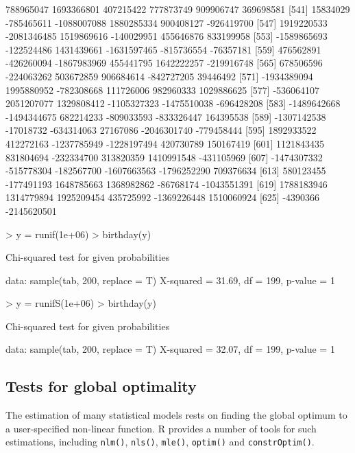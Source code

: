 \documentclass[11pt]{article}
\begin{document}
{\begin{Schunk}
\begin{Soutput}
[535]   788965047  1693366801   407215422   777873749   909906747   369698581
[541]    15834029  -785465611 -1088007088  1880285334   900408127  -926419700
[547]  1919220533 -2081346485  1519869616  -140029951   455646876   833199958
[553] -1589865693  -122524486  1431439661 -1631597465  -815736554   -76357181
[559]   476562891  -426260094 -1867983969   455441795  1642222257  -219916748
[565]   678506596  -224063262   503672859   906684614  -842727205    39446492
[571] -1934389094  1995880952  -782308668   111726006   982960333  1029886625
[577]  -536064107  2051207077  1329808412 -1105327323 -1475510038  -696428208
[583] -1489642668 -1494344675   682214233  -809033593  -833326447   164395538
[589] -1307142538   -17018732  -634314063    27167086 -2046301740  -779458444
[595]  1892933522   412272163 -1237785949 -1228197494   420730789   150167419
[601]  1121843435   831804694  -232334700   313820359  1410991548  -431105969
[607] -1474307332  -515778304  -182567700 -1607663563 -1796252290   709376634
[613]   580123455  -177491193  1648785663  1368982862   -86768174 -1043551391
[619]  1788183946  1314779894  1925209454   435725992 -1369226448  1510060924
[625]    -4390366 -2145620501
\end{Soutput}
\begin{Sinput}
> y = runif(1e+06)
> birthday(y)
\end{Sinput}
\begin{Soutput}
	Chi-squared test for given probabilities

data:  sample(tab, 200, replace = T) 
X-squared = 31.69, df = 199, p-value = 1
\end{Soutput}
\begin{Sinput}
> y = runifS(1e+06)
> birthday(y)
\end{Sinput}
\begin{Soutput}
	Chi-squared test for given probabilities

data:  sample(tab, 200, replace = T) 
X-squared = 32.07, df = 199, p-value = 1
\end{Soutput}
\end{Schunk}
}
\subsection{Tests for global optimality}

The estimation of many statistical models rests on finding the global optimum
to a user-specified non-linear function. R provides a number of tools for such
estimations, including \texttt{nlm()}, \texttt{nls()}, \texttt{mle()}, 
\texttt{optim()}  and \texttt{constrOptim()}. 
\end{document}
